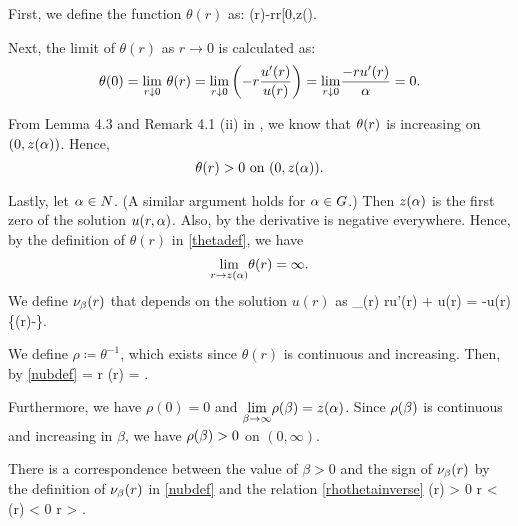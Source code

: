 
First, we define the function $\theta(r)$ as: 
\be \label{thetadef} 
    \theta(r)\coloneqq-rr\in[0,z(\alpha).
\ee

Next, the limit of $\theta(r)$ as $r \to 0$ is calculated as: 
\[
    \theta(0) = \underset{r \downarrow 0}{\lim} ~ \theta(r) = 
    \underset{r\downarrow0}{\lim} \left(-r\frac{u'(r)}{u(r)}\right) =
    \underset{r\downarrow0}{\lim}\frac{-ru'(r)}{\alpha} = 0.
\]

From Lemma 4.3 and Remark 4.1 (ii) in \cite{yana}, we know that $\theta(r)$ is
increasing on $(0, z(\alpha))$. Hence,
\[
    \theta(r) > 0 ~ \text{on} ~ (0, z(\alpha)).
\]

Lastly, let $\alpha\in N$. (A similar argument holds for $\alpha\in G$.) Then $z(\alpha)$ is the first
zero of the solution $u(r,\alpha)$. Also, by  the derivative is
negative everywhere.  Hence, by the definition of $\theta(r)$ in
\eqref{thetadef}, we have
\[
    \underset{r\to z(\alpha)}{\lim}\theta(r)=\infty.
\]
We define $\nu_{\beta}(r)$ that depends on the solution $u(r)$ as 
\be \label{nubdef} 
    \nu_{\beta}(r) \coloneqq ru'(r) + \beta u(r) =
    -u(r)\left\{\theta(r)-\beta\right\}.
\ee

We define $\rho\coloneqq\theta^{-1}$, which exists since $\theta(r)$ is
continuous and increasing. Then, by \eqref{nubdef} %
\be \label{rhothetainverse}
    \rb = r \iff \theta(r) = \beta.
\ee

Furthermore, we have $\rho(0) = 0$ and $\underset{\beta\to\infty}{\lim} \rho(\beta) =
z(\alpha)$. Since $\rho(\beta)$ is continuous and increasing in $\beta$, we have $\rho(\beta) > 0$ on
$(0,\infty)$. 

There is a correspondence between the value of $\beta > 0$ and the sign of
$\nu_{\beta}(r)$ by the definition of $\nu_{\beta}(r)$ in \eqref{nubdef} and
the relation \eqref{rhothetainverse}
\be \label{nubrhocorr}
\nub(r) > 0 \quad {} \quad r < \rb \quad {} \quad
\nub(r) < 0 \quad {} \quad r > \rb.
\ee

